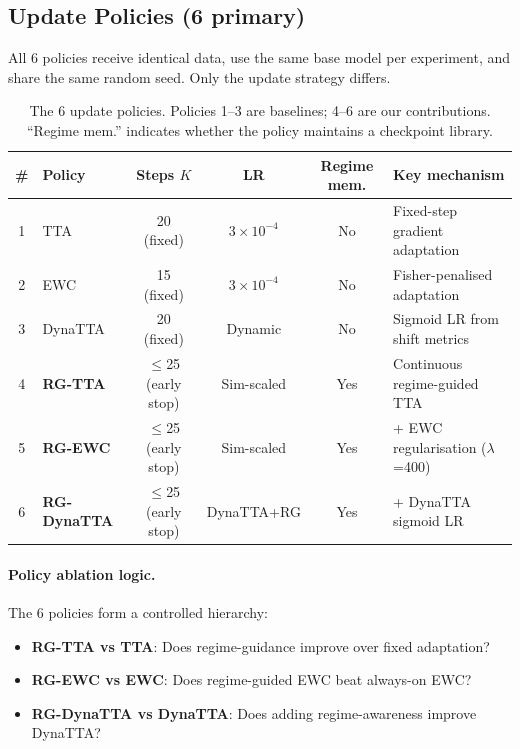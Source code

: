 \documentclass[journal]{IEEEtran}
\begin{document}
\subsection{Update Policies (6 primary)}
\label{sec:policies}

All 6 policies receive identical data, use the same base model per experiment, and share the same random seed. Only the update strategy differs.

\begin{table}[!tb]
\centering
\caption{The 6 update policies. Policies 1--3 are baselines; 4--6 are our contributions. ``Regime mem.'' indicates whether the policy maintains a checkpoint library.}
\label{tab:policies}
\small
\begin{tabular}{clcccl}
\toprule
\# & Policy & Steps $K$ & LR & Regime mem. & Key mechanism \\
\midrule
1 & TTA & 20 (fixed) & $3{\times}10^{-4}$ & No & Fixed-step gradient adaptation \\
2 & EWC & 15 (fixed) & $3{\times}10^{-4}$ & No & Fisher-penalised adaptation \\
3 & DynaTTA & 20 (fixed) & Dynamic & No & Sigmoid LR from shift metrics \\
\midrule
4 & \textbf{RG-TTA} & $\leq$25 (early stop) & Sim-scaled & Yes & Continuous regime-guided TTA \\
5 & \textbf{RG-EWC} & $\leq$25 (early stop) & Sim-scaled & Yes & + EWC regularisation ($\lambda$=400) \\
6 & \textbf{RG-DynaTTA} & $\leq$25 (early stop) & DynaTTA+RG & Yes & + DynaTTA sigmoid LR \\
\bottomrule
\end{tabular}
\end{table}

\paragraph{Policy ablation logic.} The 6 policies form a controlled hierarchy:
\begin{itemize}[nosep]
  \item \textbf{RG-TTA vs TTA}: Does regime-guidance improve over fixed adaptation?
  \item \textbf{RG-EWC vs EWC}: Does regime-guided EWC beat always-on EWC?
  \item \textbf{RG-DynaTTA vs DynaTTA}: Does adding regime-awareness improve DynaTTA?
\end{itemize}
\end{document}

